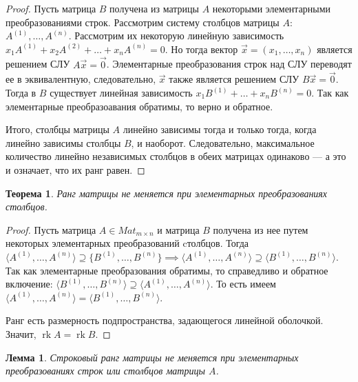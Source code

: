 \documentclass[a4paper, 12pt]{article}
\DeclareMathOperator{\rk}{rk}
\newtheorem*{que47theorem2}{Теорема}
\newtheorem*{que47cons}{Лемма}
\begin{document}
\begin{proof}
Пусть матрица $B$ получена из матрицы $A$ некоторыми элементарными преобразованиями строк. Рассмотрим систему столбцов матрицы $A$: $A^{\left(1\right)}, \dots, A^{\left(n\right)}$. Рассмотрим их некоторую линейную зависимость $x_1A^{\left(1\right)} + x_2A^{\left(2\right)} + \dots + x_nA^{\left(n\right)} = 0$. Но тогда вектор  $\vec{x} = \left(x_1, \dots, x_n\right)$ является решением СЛУ $A\vec{x} = \vec{0}$. Элементарные преобразования строк над СЛУ переводят ее в эквивалентную, следовательно, $\vec{x}$ также является решением СЛУ $B\vec{x} = \vec{0}$. Тогда в $B$ существует линейная зависимость $x_1B^{(1)} + \ldots + x_nB^{(n)} = 0$. Так как элементарные преобразоавания обратимы, то верно и обратное.

Итого, столбцы матрицы $A$ линейно зависимы тогда и только тогда, когда линейно зависимы столбцы $B$, и наоборот. Следовательно, максимальное количество линейно независимых столбцов в обеих матрицах одинаково — а это и означает, что их ранг равен.
\end{proof}

\begin{que47theorem2}
Ранг матрицы не меняется при элементарных преобразованиях столбцов.
\end{que47theorem2}

\begin{proof}
Пусть матрица $A \in Mat_{m\times n}$ и матрица $B$ получена из нее путем некоторых элементарных преобразований cтолбцов. Тогда $\langle A^{\left(1\right)},\dots, A^{\left(n\right)}\rangle \supseteq \{B^{\left(1\right)},\dots,B^{\left(n\right)}\} \implies \langle A^{\left(1\right)},\dots, A^{\left(n\right)}\rangle \supseteq \langle B^{\left(1\right)},\dots,B^{\left(n\right)}\rangle$. Так как элементарные преобразования обратимы, то справедливо и обратное включение: $\langle B^{\left(1\right)},\dots, B^{\left(n\right)}\rangle \supseteq \langle A^{\left(1\right)},\dots,A^{\left(n\right)}\rangle$. То есть имеем $\langle A^{\left(1\right)},\dots, A^{\left(n\right)}\rangle = \langle B^{\left(1\right)},\dots,B^{\left(n\right)}\rangle$.

Ранг есть размерность подпространства, задающегося линейной оболочкой. Значит, $\rk{A} = \rk{B}$.
\end{proof}

\begin{que47cons}
Строковый ранг матрицы не меняется при элементарных преобразованиях строк или столбцов матрицы $A$. 
\end{que47cons}
\end{document}
